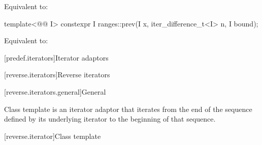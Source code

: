 \begin{itemdescr}
\pnum
\effects
Equivalent to: 
\end{itemdescr}

%
\begin{itemdecl}
template<@@ I>
  constexpr I ranges::prev(I x, iter_difference_t<I> n, I bound);
\end{itemdecl}

\begin{itemdescr}
\pnum
\effects
Equivalent to: 
\end{itemdescr}

[predef.iterators]{Iterator adaptors}

[reverse.iterators]{Reverse iterators}

[reverse.iterators.general]{General}

\pnum
Class template  is an iterator adaptor that iterates from the end of the sequence defined by its underlying iterator to the beginning of that sequence.

[reverse.iterator]{Class template }

